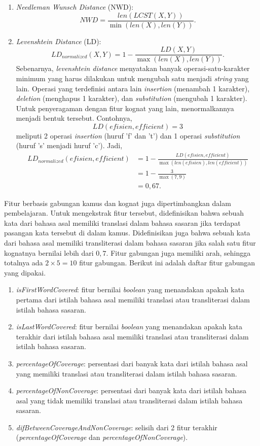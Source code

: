 \documentclass[../main/main.tex]{subfiles}
\begin{document}
\begin{enumerate}
\item \textit{Needleman Wunsch Distance} (NWD):
\begin{equation}
	NWD = \frac{len(LCST(X,Y))}{\min(len(X), len(Y))}.
\end{equation}
\item \textit{Levenshtein Distance} (LD):
\begin{equation}
	LD_{normalized}(X,Y) = 1 - \frac{LD(X,Y)}{\max(len(X), len(Y))}.
\end{equation}
Sebenarnya, \textit{levenshtein distance} menyatakan banyak operasi-satu-karakter minimum yang harus dilakukan untuk mengubah satu  menjadi \textit{string} yang lain. Operasi yang terdefinisi antara lain \textit{insertion} (menambah 1 karakter), \textit{deletion} (menghapus 1 karakter), dan \textit{substitution} (mengubah 1 karakter). Untuk penyeragaman dengan fitur kognat yang lain, \textcite{aker} menormalkannya menjadi bentuk tersebut. Contohnya, \[ LD(efisien,efficient) = 3 \] meliputi 2 operasi \textit{insertion} (huruf 'f' dan 't') dan 1 operasi \textit{substitution} (huruf 's' menjadi huruf 'c'). Jadi,
\[
	\begin{aligned}
		LD_{normalized}(efisien,efficient) &= 1 - \frac{LD(efisien,efficient)}{\max(len(efisien), len(efficient))}\\
		&= 1 - \frac{3}{\max(7,9)}\\
		&= 0,67.
	\end{aligned}
\]
\end{enumerate}

Fitur berbasis gabungan kamus dan kognat juga dipertimbangkan dalam pembelajaran. Untuk mengekstrak fitur tersebut, didefinisikan bahwa sebuah kata dari bahasa asal memiliki translasi dalam bahasa sasaran jika terdapat pasangan kata tersebut di dalam kamus. Didefinisikan juga bahwa sebuah kata dari bahasa asal memiliki transliterasi dalam bahasa sasaran jika salah satu fitur kognatnya bernilai lebih dari $0,7$. Fitur gabungan juga memiliki arah, sehingga totalnya ada $2 \times 5 = 10$ fitur gabungan. Berikut ini adalah daftar fitur gabungan yang dipakai.
\begin{enumerate}
\item \textit{isFirstWordCovered}: fitur bernilai \textit{boolean} yang menandakan apakah kata pertama dari istilah bahasa asal memiliki translasi atau transliterasi dalam istilah bahasa sasaran.
\item \textit{isLastWordCovered}: fitur bernilai \textit{boolean} yang menandakan apakah kata terakhir dari istilah bahasa asal memiliki translasi atau transliterasi dalam istilah bahasa sasaran.
\item \textit{percentageOfCoverage}: persentasi dari banyak kata dari istilah bahasa asal yang memiliki translasi atau transliterasi dalam istilah bahasa sasaran.
\item \textit{percentageOfNonCoverage}: persentasi dari banyak kata dari istilah bahasa asal yang tidak memiliki translasi atau transliterasi dalam istilah bahasa sasaran.
\item \textit{difBetweenCoverageAndNonCoverage}: selisih dari 2 fitur terakhir (\textit{percentageOfCoverage} dan \textit{percentageOfNonCoverage}).
\end{enumerate}
\end{document}
